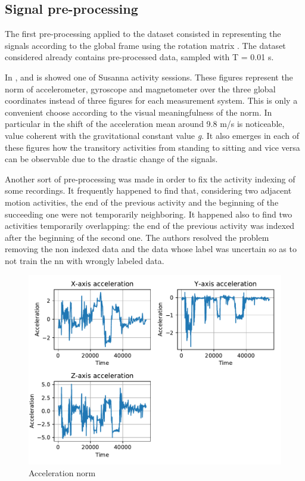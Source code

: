 \subsection{Signal pre-processing}
The first pre-processing applied to the dataset consisted in representing the signals according to the global frame using the rotation matrix . The dataset considered already contains pre-processed data, sampled with T = 0.01 s.

In ,  and  is showed one of Susanna activity sessions. These figures represent the norm of accelerometer, gyroscope and magnetometer over the three global coordinates instead of three figures for each measurement system. This is only a convenient choose according to the visual meaningfulness of the norm. In particular in  the shift of the acceleration mean around 9.8 m/s is noticeable, value coherent with the gravitational constant value \textit{g}. It also emerges in each of these figures how the transitory activities from standing to sitting and vice versa can be observable due to the drastic change of the signals.

Another sort of pre-processing was made in order to fix the activity indexing of some recordings. It frequently happened to find that, considering two adjacent motion activities, the end of the previous activity and the beginning of the succeeding one were not temporarily neighboring. It happened also to find two activities temporarily overlapping: the end of the previous activity was indexed after the beginning of the second one. 
The authors resolved the problem removing the non indexed data and the data whose label was uncertain so as to not train the \gls{nn} with wrongly labeled data.


\begin{figure}[htp]
\includegraphics[scale=0.55]{acceleration_susanna.pdf}
\caption{Acceleration norm}
\label{fig:acc}
\end{figure}

